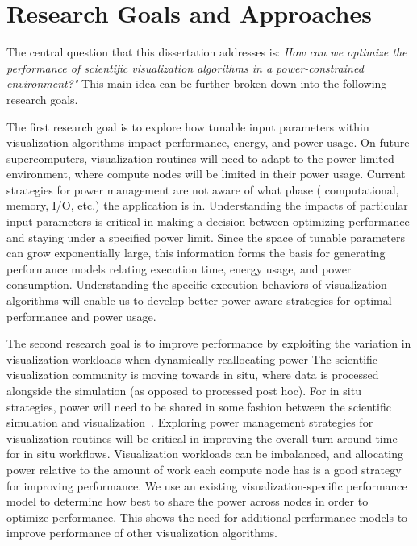 \section{Research Goals and Approaches}

The central question that this dissertation addresses is:
%
\emph{How can we optimize the performance of scientific visualization
algorithms in a power-constrained environment?"}
%
This main idea can be further broken down into the following research goals.

The first research goal is to explore how tunable input parameters within
visualization algorithms impact performance, energy, and power usage.
%
On future supercomputers, visualization routines will need to
adapt to the power-limited environment, where compute nodes will be limited in
their power usage.
%
Current strategies for power management are not aware of what phase (\eg
computational, memory, I/O, etc.) the application is in.
%
Understanding the impacts of particular input parameters is critical in making
a decision between optimizing performance and staying under a specified power limit.
%
Since the space of tunable parameters can grow exponentially large, this
information forms the basis for generating performance models relating
execution time, energy usage, and power consumption.
%
Understanding the specific execution behaviors of visualization algorithms will
enable us to develop better power-aware strategies for optimal performance and
power usage.

The second research goal is to improve performance by exploiting the
variation in visualization workloads when dynamically reallocating power
%
The scientific visualization community is moving towards in situ, where data is
processed alongside the simulation (as opposed to processed post hoc).
%
For in situ strategies, power will need to be shared in some fashion between
the scientific simulation and visualization~\cite{7515682}.
%
Exploring power management strategies for visualization routines will be
critical in improving the overall turn-around time for in situ workflows.
%
Visualization workloads can be imbalanced, and allocating power relative to
the amount of work each compute node has is a good strategy for improving
performance.
%
We use an existing visualization-specific performance model to determine how
best to share the power across nodes in order to optimize performance.
%
This shows the need for additional performance models to improve performance of
other visualization algorithms.

